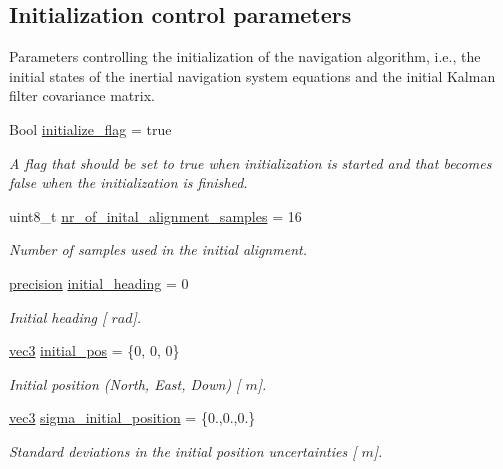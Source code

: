 \subsection*{\-Initialization control parameters}
\label{_amgrpa118b835fc84476bcd7bcacc21f1e294}%
 \-Parameters controlling the initialization of the navigation algorithm, i.\-e., the initial states of the inertial navigation system equations and the initial \-Kalman filter covariance matrix. \begin{DoxyCompactItemize}
\item 
\-Bool \hyperlink{group__nav__eq_gac64a954fe1bf13df62e1e96920a36035}{initialize\-\_\-flag} = true
\begin{DoxyCompactList}\small\item\em \-A flag that should be set to true when initialization is started and that becomes false when the initialization is finished. \end{DoxyCompactList}\item 
uint8\-\_\-t \hyperlink{group__nav__eq_gaf3c89a8b1365434986dc0314c1c541cf}{nr\-\_\-of\-\_\-inital\-\_\-alignment\-\_\-samples} = 16
\begin{DoxyCompactList}\small\item\em \-Number of samples used in the initial alignment. \end{DoxyCompactList}\item 
\hyperlink{nav__types_8h_a37e1884b1f06826c49607cec459b4e8a}{precision} \hyperlink{group__nav__eq_gaf18deb1376fcc761f2ec2d947cf004e7}{initial\-\_\-heading} = 0
\begin{DoxyCompactList}\small\item\em \-Initial heading \mbox{[} $rad$\mbox{]}. \end{DoxyCompactList}\item 
\hyperlink{nav__types_8h_a90c683614d896321009d3b3c401b764f}{vec3} \hyperlink{group__nav__eq_ga7cd4f9c9472377e6ef5935727ada7109}{initial\-\_\-pos} = \{0, 0, 0\}
\begin{DoxyCompactList}\small\item\em \-Initial position (\-North, \-East, \-Down) \mbox{[} $m$\mbox{]}. \end{DoxyCompactList}\item 
\hyperlink{nav__types_8h_a90c683614d896321009d3b3c401b764f}{vec3} \hyperlink{group__nav__eq_ga0ace968269836475a5c59c16280d1bf1}{sigma\-\_\-initial\-\_\-position} = \{0.,0.,0.\}
\begin{DoxyCompactList}\small\item\em \-Standard deviations in the initial position uncertainties \mbox{[} $m$\mbox{]}. \end{DoxyCompactList}\item 

\end{DoxyCompactItemize}
